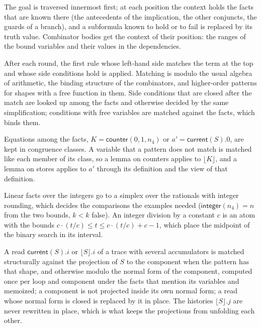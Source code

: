\documentclass[11pt,a4paper]{article}
\newcommand{\bl}[1]{\lfloor #1\rfloor}                       %
\newcommand{\cnt}{\mathsf{counter}}
\newcommand{\cur}{\mathsf{current}}
\newcommand{\intf}{\mathsf{integer}}
\begin{document}
\begin{description}[leftmargin=1.5em]
\item[Contextual simplification.] The goal is traversed innermost first; at each position the context holds the facts
  that are known there (the antecedents of the implication, the other conjuncts, the guards of a branch), and a
  subformula known to hold or to fail is replaced by its truth value. Combinator bodies get the context of their
  position: the ranges of the bound variables and their values in the dependencies.
\item[Rewriting with the database.] After each round, the first rule whose left-hand side matches the term at the
  top and whose side conditions hold is applied. Matching is modulo the usual algebra of arithmetic, the binding
  structure of the combinators, and higher-order patterns for shapes with a free function in them. Side
  conditions that are closed after the match are looked up among the facts and otherwise decided by the same
  simplification; conditions with free variables are matched against the facts, which binds them.
\item[Definitions and classes.] Equations among the facts, $K = \cnt(0, 1, n_4)$ or $a' = \cur(S).0$, are kept
  in congruence classes. A variable that a pattern does not match is matched like each member of its class, so
  a lemma on counters applies to $\bl{K}$, and a lemma on stores applies to $a'$ through its definition and the view
  of that definition.
\item[Arithmetic.] Linear facts over the integers go to a simplex over the rationals with integer rounding, which
  decides the comparisons the examples needed ($\intf(n_4) = n$ from the two bounds, $k < k$ false). An integer
  division by a constant $c$ is an atom with the bounds $c \cdot (t/c) \le t \le c \cdot (t/c) + c - 1$, which place the
  midpoint of the binary search in its interval.
\item[Components of a cycle.] A read $\cur(S).i$ or $\bl{S}.i$ of a trace with several accumulators is matched
  structurally against the projection of $S$ to the component when the pattern has that shape, and otherwise modulo
  the normal form of the component, computed once per loop and component under the facts that mention its variables
  and memoized; a component is not projected inside its own normal form; a read whose normal form is closed is
  replaced by it in place. The histories $\bl{S}.j$ are never rewritten in place, which is what keeps the projections
  from unfolding each other.

\end{description}
\end{document}
